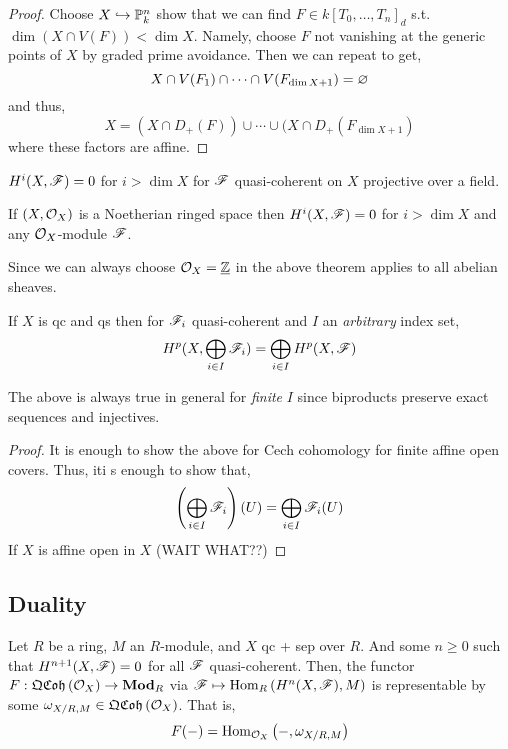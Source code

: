 \documentclass[12pt]{article}
\begin{document}
\begin{proof}
Choose $X \hookrightarrow \mathbb{P}^n_k$ show that we can find $F \in k[T_0, \dots, T_n]_{d}$ s.t. $\dim{(X \cap V(F))} < \dim{X}$. Namely, choose $F$ not vanishing at the generic points of $X$ by graded prime avoidance. Then we can repeat to get,
\[ X \cap V(F_1) \cap \cdots \cap V(F_{\dim{X} + 1}) = \varnothing \]
and thus,
\[ X = (X \cap D_+(F)) \cup \cdots \cup (X \cap D_+(F_{\dim{X}+1}) \]
where these factors are affine. 
\end{proof}

\begin{cor}
$H^i(X, \mathscr{F}) = 0$ for $i > \dim{X}$ for $\mathscr{F}$ quasi-coherent on $X$ projective over a field.
\end{cor}

\begin{theorem}[Grothendieck]
If $(X, \mathcal{O}_{X})$ is a Noetherian ringed space then $H^i(X, \mathscr{F}) = 0$ for $i > \dim{X}$ and any $\mathcal{O}_{X}$-module $\mathscr{F}$. 
\end{theorem}

\begin{rmk}
Since we can always choose $\mathcal{O}_{X} = \underline{\mathbb{Z}}$ in the above theorem applies to all abelian sheaves. 
\end{rmk}

\begin{lemma}
If $X$ is qc and qs then for $\mathscr{F}_i$ quasi-coherent and $I$ an \textit{arbitrary} index set,
\[ H^p(X, \bigoplus_{i \in I} \mathscr{F}_i) = \bigoplus_{i \in I} H^p(X, \mathscr{F}) \]
\end{lemma}

\begin{rmk}
The above is always true in general for \textit{finite} $I$ since biproducts preserve exact sequences and injectives.
\end{rmk}

\begin{proof}
It is enough to show the above for Cech cohomology for finite affine open covers. Thus, iti s enough to show that,
\[ \left( \bigoplus_{i \in I} \mathscr{F}_i \right)(U) = \bigoplus_{i \in I} \mathscr{F}_i(U) \]
If $X$ is affine open in $X$ (WAIT WHAT??)
\end{proof}

\subsection{Duality}

\begin{lemma}
Let $R$ be a ring, $M$ an $R$-module, and $X$ qc + sep over $R$. And some $n \ge 0$ such that $H^{n+1}(X, \mathscr{F}) = 0$ for all $\mathscr{F}$ quasi-coherent. Then, the functor $F : \mathfrak{QCoh}\left(\mathcal{O}_{X}\right) \to \mathbf{Mod}_{R}$ via $\mathscr{F} \mapsto \mathrm{Hom}_{R} \left( H^n(X, \mathscr{F}), M \right)$ is representable by some $\omega_{X/R, M} \in \mathfrak{QCoh}\left(\mathcal{O}_{X}\right)$. That is,
\[ F(-) = \mathrm{Hom}_{\mathcal{O}_{X}} \left( -, \omega_{X / R, M} \right) \]
\end{lemma}
\end{document}
